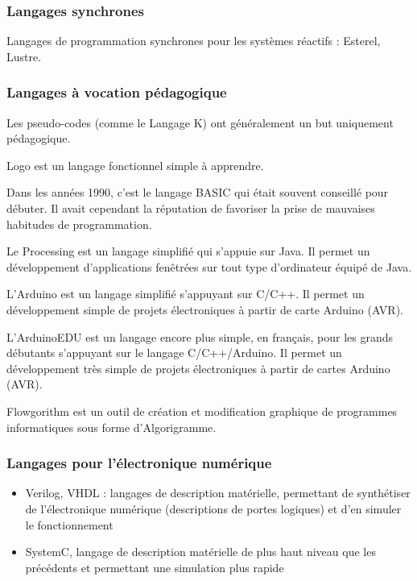 \documentclass[a4paper,12pt]{article}
\begin{document}
\subsubsection{Langages synchrones}

Langages de programmation synchrones pour les systèmes réactifs : Esterel, Lustre.

\subsubsection{Langages à vocation pédagogique}

Les pseudo-codes (comme le Langage K) ont généralement un but uniquement pédagogique.

Logo est un langage fonctionnel simple à apprendre.

Dans les années 1990, c'est le langage BASIC qui était souvent conseillé pour débuter. Il avait cependant la réputation de favoriser la prise de mauvaises habitudes de programmation.

Le Processing est un langage simplifié qui s'appuie sur Java. Il permet un développement d'applications fenêtrées sur tout type d'ordinateur équipé de Java.

L'Arduino est un langage simplifié s'appuyant sur C/C++. Il permet un développement simple de projets électroniques à partir de carte Arduino (AVR).

L'ArduinoEDU est un langage encore plus simple, en français, pour les grands débutants s'appuyant sur le langage C/C++/Arduino. Il permet un développement très simple de projets électroniques à partir de cartes Arduino (AVR).

Flowgorithm est un outil de création et modification graphique de programmes informatiques sous forme d'Algorigramme.

\subsubsection{Langages pour l'électronique numérique}

\begin{itemize}[label=\textbullet]

\item Verilog, VHDL : langages de description matérielle, permettant de synthétiser de l'électronique numérique (descriptions de portes logiques) et d'en simuler le fonctionnement

\item SystemC, langage de description matérielle de plus haut niveau que les précédents et permettant une simulation plus rapide

\end{itemize}
\end{document}
